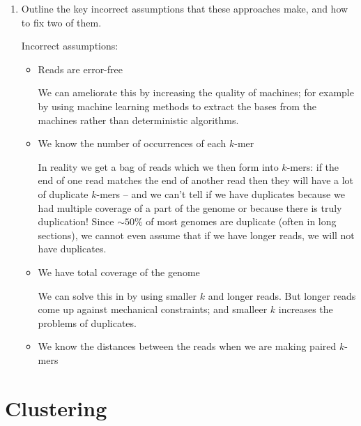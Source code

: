 \documentclass[10pt,\jkfside,a4paper]{article}
\begin{document}
\begin{enumerate}
    \item Outline the key incorrect assumptions that these approaches make, and how to fix two of them.

    Incorrect assumptions:

    \begin{itemize}

        \item Reads are error-free

        We can ameliorate this by increasing the quality of machines; for example by using machine learning methods to extract the bases from the machines rather than deterministic algorithms.

        \item We know the number of occurrences of each $k$-mer

        In reality we get a bag of reads which we then form into $k$-mers: if the end of one read matches the end of another read then they will have a lot of duplicate $k$-mers -- and we can't tell if we have
        duplicates because we had multiple coverage of a part of the genome or because there is truly duplication! Since $\sim 50 \%$ of most genomes are duplicate (often in long sections), we cannot even
        assume that if we have longer reads, we will not have duplicates.

        \item We have total coverage of the genome

        We can solve this in by using smaller $k$ and longer reads. But longer reads come up against mechanical constraints; and smalleer $k$ increases the problems of duplicates.

        \item We know the distances between the reads when we are making paired $k$-mers

    \end{itemize}

\end{enumerate}

\section{Clustering}
\end{document}
